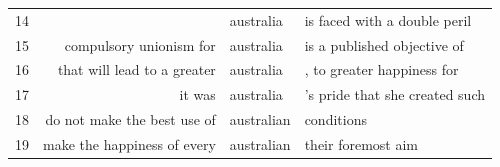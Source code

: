 \documentclass{beamer}       %
\begin{document}
\begin{frame}
\begin{table}
\begin{tabular}{lrll}
  14 &                                  & australia    & is faced with a double peril \\
  15 &          compulsory unionism for & australia    & is a published objective of \\
  16 &      that will lead to a greater & australia    & , to greater happiness for \\
  17 &                           it was & australia    & 's pride that she created such \\
  18 &      do not make the best use of & australian   & conditions \\
  19 &      make the happiness of every & australian   & their foremost aim \\

\end{tabular}
\end{table}
\end{frame}
\end{document}
